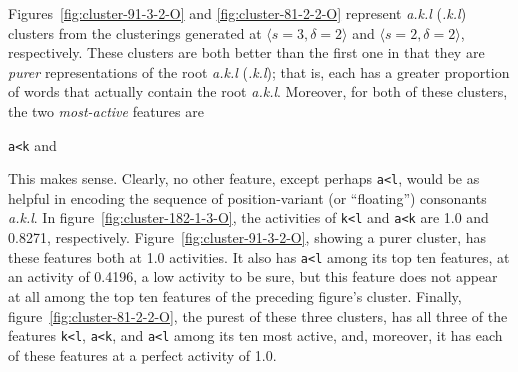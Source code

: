 Figures~\ref{fig:cluster-91-3-2-O} and \ref{fig:cluster-81-2-2-O} represent \textit{a.k.l}
(\textit{.k.l}) clusters from the clusterings generated at
$\langle{s}=3,\delta=2 \rangle$ and $\langle s=2, \delta=2 \rangle$, respectively. 
These clusters are both better than the first one in that they are
\emph{purer} representations of the root \textit{a.k.l} (\textit{.k.l}); that is,
each has a greater proportion of words that actually contain the root \textit{a.k.l}.
Moreover, for both of these clusters, the two \emph{most-active} features are 
\begin{center}
 { \texttt{a<k}} \quad  and 
\end{center}
This makes sense. Clearly, no other feature, except perhaps \texttt{a<l}, would be as helpful in 
encoding the sequence of  position-variant (or ``floating'') consonants \textit{a.k.l}. In figure~\ref{fig:cluster-182-1-3-O}, the activities of \texttt{k<l} and \texttt{a<k} are 1.0 and 0.8271, respectively.
Figure~\ref{fig:cluster-91-3-2-O}, showing a purer cluster, has these features both at 1.0 activities. It also has \texttt{a<l} among its top ten features, 
at an activity of 0.4196, a low activity to be sure, but this feature does not appear at all among the top ten features of the preceding figure's
cluster. 
Finally, figure~\ref{fig:cluster-81-2-2-O}, the purest of these three clusters, has all three of the features \texttt{k<l}, \texttt{a<k}, and \texttt{a<l} among
its ten most active,
and, moreover, it has each of these features at a perfect activity of 1.0.

